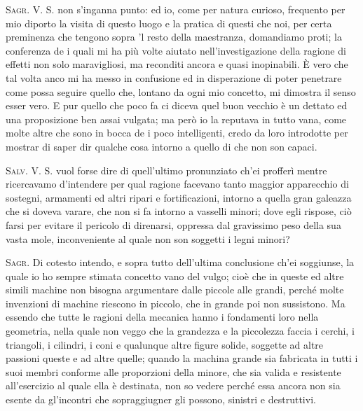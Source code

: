 \documentclass[11pt,twoside,openany]{book}
\newcommand{\speaker}[1]{\textcolor{rubric}{\textsc{#1}}\space}
\begin{document}
\speaker{Sagr.} V. S. non s'inganna punto: ed io, come per natura curioso, frequento per mio diporto la visita di questo luogo e la pratica di questi che noi, per certa preminenza che tengono sopra 'l resto della maestranza, domandiamo proti; la conferenza de i quali mi ha più volte aiutato nell'investigazione della ragione di effetti non solo maravigliosi, ma reconditi ancora e quasi inopinabili. È vero che tal volta anco mi ha messo in confusione ed in disperazione di poter penetrare come possa seguire quello che, lontano da ogni mio concetto, mi dimostra il senso esser vero. E pur quello che poco fa ci diceva quel buon vecchio è un dettato ed una proposizione ben assai vulgata; ma però io la reputava in tutto vana, come molte altre che sono in bocca de i poco intelligenti, credo da loro introdotte per mostrar di saper dir qualche cosa intorno a quello di che non son capaci.

\speaker{Salv.} V. S. vuol forse dire di quell'ultimo pronunziato ch'ei profferì mentre ricercavamo d'intendere per qual ragione facevano tanto maggior apparecchio di sostegni, armamenti ed altri ripari e fortificazioni, intorno a quella gran galeazza che si doveva varare, che non si fa intorno a vasselli minori; dove egli rispose, ciò farsi per evitare il pericolo di direnarsi, oppressa dal gravissimo peso della sua vasta mole, inconveniente al quale non son soggetti i legni minori?

\speaker{Sagr.} Di cotesto intendo, e sopra tutto dell'ultima conclusione ch'ei soggiunse, la quale io ho sempre stimata concetto vano del vulgo; cioè che in queste ed altre simili machine non bisogna argumentare dalle piccole alle grandi, perché molte invenzioni di machine riescono in piccolo, che in grande poi non sussistono. Ma essendo che tutte le ragioni della mecanica hanno i fondamenti loro nella geometria, nella quale non veggo che la grandezza e la piccolezza faccia i cerchi, i triangoli, i cilindri, i coni e qualunque altre figure solide, soggette ad altre passioni queste e ad altre quelle; quando la machina grande sia fabricata in tutti i suoi membri conforme alle proporzioni della minore, che sia valida e resistente all'esercizio al quale ella è destinata, non so vedere perché essa ancora non sia esente da gl'incontri che sopraggiugner gli possono, sinistri e destruttivi.
\end{document}
